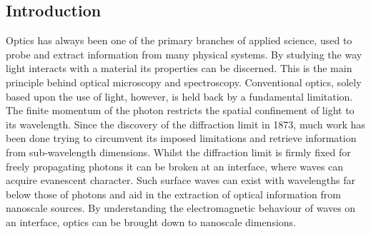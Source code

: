 \documentclass[12pt, a4paper, twoside]{book}
\begin{document}
\begin{singlespace}
\color{white}
\chapter{Introduction}
\end{singlespace}


Optics has always been one of the primary branches of applied science, used to probe and extract information from many physical systems. By studying the way light interacts with a material its properties can be discerned. This is the main principle behind optical microscopy and spectroscopy. Conventional optics, solely based upon the use of light, however, is held back by a fundamental limitation. The finite momentum of the photon restricts the spatial confinement of light to its wavelength. Since the discovery of the diffraction limit in 1873, much work has been done trying to circumvent its imposed limitations and retrieve information from sub-wavelength dimensions. Whilst the diffraction limit is firmly fixed for freely propagating photons it can be broken at an interface, where waves can acquire evanescent character. Such surface waves can exist with wavelengths far below those of photons and aid in the extraction of optical information from nanoscale sources. By understanding the electromagnetic behaviour of waves on an interface, optics can be brought down to nanoscale dimensions.
\end{document}
